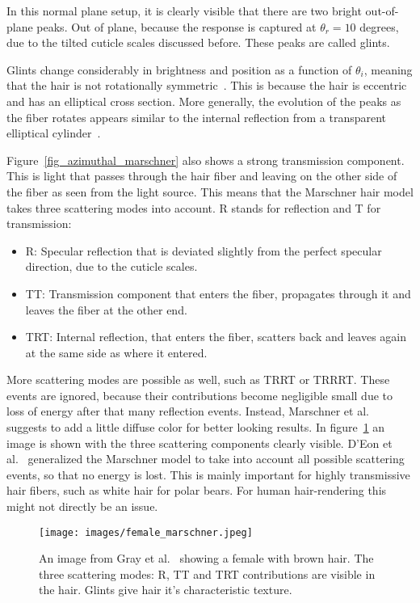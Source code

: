 \documentclass[11pt,a4paper]{report}
\begin{document}
In this normal plane setup, it is clearly visible that there are two bright out-of-plane peaks. Out of plane, because the response is captured at $\theta_r = 10$ degrees, due to the tilted cuticle scales discussed before. These peaks are called glints.

Glints change considerably in brightness and position as a function of $\theta_i$,  meaning that the hair is not rotationally symmetric~\cite{marschner}. This is because the hair is eccentric and has an elliptical cross section. More generally, the evolution of the peaks as the fiber rotates appears similar to the internal reflection from a transparent elliptical cylinder~\cite{marschner}.

Figure~\ref{fig_azimuthal_marschner} also shows a strong transmission component. This is light that passes through the hair fiber and leaving on the other side of the fiber as seen from the light source. This means that the Marschner hair model takes three scattering modes into account. R stands for reflection and T for transmission:

\begin{itemize}
\item R: Specular reflection that is deviated slightly from the perfect specular direction, due to the cuticle scales.
\item TT: Transmission component that enters the fiber, propagates through it and leaves the fiber at the other end.
\item TRT: Internal reflection, that enters the fiber, scatters back and leaves again at the same side as where it entered.
\end{itemize}

More scattering modes are possible as well, such as TRRT or TRRRT. These events are ignored, because their contributions become negligible small due to loss of energy after that many reflection events. Instead, Marschner et al.~\cite{marschner} suggests to add a little diffuse color for better looking results. In figure~\ref{female_hair} an image is shown with the three scattering components clearly visible. D'Eon et al.~\cite{eon2011} generalized the Marschner model to take into account all possible scattering events, so that no energy is lost. This is mainly important for highly transmissive hair fibers, such as white hair for polar bears. For human hair-rendering this might not directly be an issue.

\begin{figure}[h]
\begin{center}
\texttt{[image: images/female\_marschner.jpeg]}
\caption{An image from Gray et al.~\cite{gray} showing a female with brown hair. The three scattering modes: R, TT and TRT contributions are visible in the hair. Glints give hair it's characteristic texture.}
\label{female_hair}
\end{center}
\end{figure}
\end{document}
